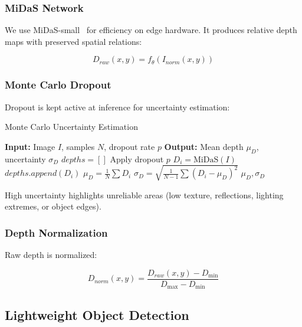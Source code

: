 \documentclass[12pt,oneside]{book}
\begin{document}
\subsubsection{MiDaS Network}

We use MiDaS-small~\cite{ranftl2020towards} for efficiency on edge hardware. It produces relative depth maps with preserved spatial relations:

\begin{equation}
D_{raw}(x,y) = f_{\theta}(I_{norm}(x,y))
\label{eq:midas_forward}
\end{equation}

\subsubsection{Monte Carlo Dropout}

Dropout is kept active at inference for uncertainty estimation:

\begin{algorithm}
\caption{Monte Carlo Uncertainty Estimation}
\begin{algorithmic}
\STATE \textbf{Input:} Image $I$, samples $N$, dropout rate $p$
\STATE \textbf{Output:} Mean depth $\mu_D$, uncertainty $\sigma_D$
\STATE $depths = []$
    \STATE Apply dropout $p$
    \STATE $D_i = \text{MiDaS}(I)$
    \STATE $depths.append(D_i)$
\ENDFOR
\STATE $\mu_D = \frac{1}{N} \sum D_i$
\STATE $\sigma_D = \sqrt{\frac{1}{N-1} \sum (D_i - \mu_D)^2}$
\RETURN $\mu_D, \sigma_D$
\end{algorithmic}
\end{algorithm}

High uncertainty highlights unreliable areas (low texture, reflections, lighting extremes, or object edges).

\subsubsection{Depth Normalization}

Raw depth is normalized:

\begin{equation}
D_{norm}(x,y) = \frac{D_{raw}(x,y) - D_{\min}}{D_{\max} - D_{\min}}
\label{eq:depth_normalization}
\end{equation}

\subsection{Lightweight Object Detection}
\end{document}
